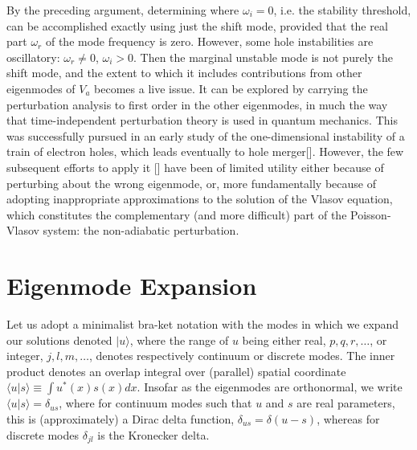 \documentclass[12pt]{article}
\def\ket#1{|#1\rangle}
\def\bra#1{\langle#1}
\begin{document}
By the preceding argument, determining where $\omega_i=0$, i.e. the
stability threshold, can be accomplished exactly using just the shift
mode, provided that the real part $\omega_r$ of the mode frequency is
zero. However, some hole instabilities are oscillatory:
$\omega_r\not=0$, $\omega_i>0$. Then the marginal unstable mode is not
purely the shift mode, and the extent to which it includes
contributions from other eigenmodes of $V_a$ becomes a live issue. It
can be explored by carrying the perturbation analysis to first order
in the other eigenmodes, in much the way that time-independent
perturbation theory is used in quantum mechanics. This was
successfully pursued in an early study of the one-dimensional
instability of a train of electron holes, which leads eventually to
hole merger[]. However, the few subsequent efforts to apply it [] have
been of limited utility either because of perturbing about the wrong
eigenmode, or, more fundamentally because of adopting inappropriate
approximations to the solution of the Vlasov equation, which
constitutes the complementary (and more difficult) part of the
Poisson-Vlasov system: the non-adiabatic perturbation.


\section{Eigenmode Expansion}
Let us adopt a minimalist bra-ket notation with the modes in
which we expand our solutions
denoted $\ket{u}$, where the range of $u$ being either real, $p,q,r,\dots$, or
integer, $j,l,m,\dots$, denotes respectively continuum or discrete modes. The
inner product denotes an overlap integral over (parallel) spatial
coordinate $\bra{u}\ket{s}\equiv \int u^*(x)s(x)dx$. Insofar as the
eigenmodes are orthonormal, we write $\bra{u}\ket{s}=\delta_{us}$,
where for continuum modes such that $u$ and $s$ are real parameters,
this is (approximately) a Dirac delta function,
$\delta_{us}=\delta(u-s)$, whereas for discrete modes $\delta_{jl}$ is
the Kronecker delta.
\end{document}
